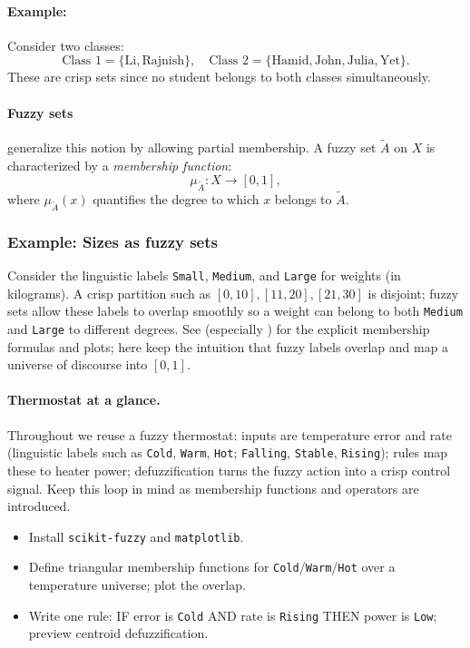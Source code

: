 \paragraph{Example:} Consider two classes:
\[
\text{Class 1} = \{\text{Li}, \text{Rajnish}\}, \quad \text{Class 2} = \{\text{Hamid}, \text{John}, \text{Julia}, \text{Yet}\}.
\]
These are crisp sets since no student belongs to both classes simultaneously.

\paragraph{Fuzzy sets} generalize this notion by allowing partial membership. A fuzzy set \( \tilde{A} \) on \(X\) is characterized by a \emph{membership function}:
\begin{equation}
\mu_{\tilde{A}}: X \to [0,1],
\label{eq:softcomp_membership_function}
\end{equation}
where \(\mu_{\tilde{A}}(x)\) quantifies the degree to which \(x\) belongs to \(\tilde{A}\).

\subsubsection*{Example: Sizes as fuzzy sets}
Consider the linguistic labels \texttt{Small}, \texttt{Medium}, and \texttt{Large} for weights (in kilograms). A crisp partition such as \([0,10],[11,20],[21,30]\) is disjoint; fuzzy sets allow these labels to overlap smoothly so a weight can belong to both \texttt{Medium} and \texttt{Large} to different degrees. See  (especially ) for the explicit membership formulas and plots; here keep the intuition that fuzzy labels overlap and map a universe of discourse into \([0,1]\).

\paragraph{Thermostat at a glance.} Throughout  we reuse a fuzzy thermostat: inputs are temperature error and rate (linguistic labels such as \texttt{Cold}, \texttt{Warm}, \texttt{Hot}; \texttt{Falling}, \texttt{Stable}, \texttt{Rising}); rules map these to heater power; defuzzification turns the fuzzy action into a crisp control signal. Keep this loop in mind as membership functions and operators are introduced.

\begin{tcolorbox}[summarybox, title={Lab prep: fuzzy thermostat starter}]
\begin{itemize}
    \item Install \texttt{scikit-fuzzy} and \texttt{matplotlib}.
    \item Define triangular membership functions for \texttt{Cold}/\texttt{Warm}/\texttt{Hot} over a temperature universe; plot the overlap.
    \item Write one rule: IF error is \texttt{Cold} AND rate is \texttt{Rising} THEN power is \texttt{Low}; preview centroid defuzzification.
\end{itemize}
\end{tcolorbox}

